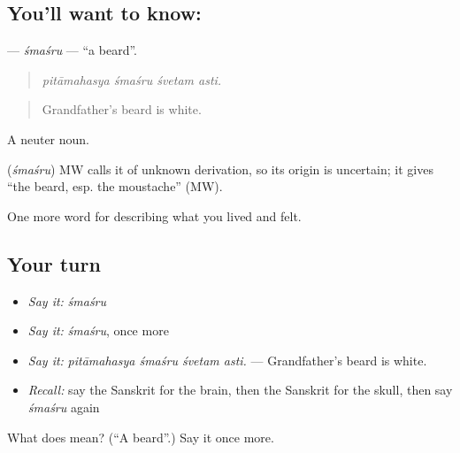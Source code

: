 \subsection*{You'll want to know: }
\textbf{} — \emph{śmaśru} — \textquotedblleft{}a beard\textquotedblright{}.

\begin{quote}
   
\end{quote}

\begin{quote}
\emph{pitāmahasya śmaśru śvetam asti.}
\end{quote}

\begin{quote}
Grandfather's beard is white.
\end{quote}

A neuter noun.

\begin{cousinweb}
\textbf{} (\emph{śmaśru}) MW calls it of unknown derivation, so its origin is uncertain; it gives \textquotedblleft{}the beard, esp. the moustache\textquotedblright{} (MW).
\end{cousinweb}

\begin{grammarlens}[title={What you've built}]
One more word for describing what you lived and felt.
\end{grammarlens}

\subsection*{Your turn}
\begin{itemize}
\raggedright
  \item \emph{Say it:} \emph{śmaśru}
  \item \emph{Say it:} \emph{śmaśru}, once more
  \item \emph{Say it:} \emph{pitāmahasya śmaśru śvetam asti.} — Grandfather's beard is white.
  \item \emph{Recall:} say the Sanskrit for the brain, then the Sanskrit for the skull, then say \emph{śmaśru} again
\end{itemize}

\begin{tcolorbox}[breakable,colback=teal!4,colframe=teal!35!black,title={Before you move on}]
What does  mean? (\textquotedblleft{}A beard\textquotedblright{}.) Say it once more.
\end{tcolorbox}
